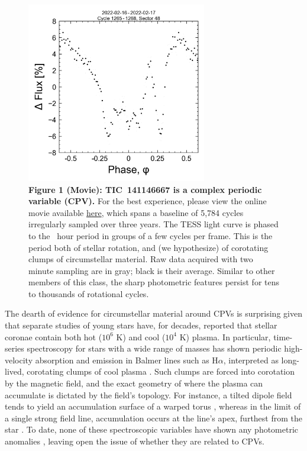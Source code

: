 \documentclass{nature3}
\begin{document}
\begin{figure}[!t]
  \centering
  \includegraphics[width=0.7\textwidth]{figures/f1.png}
  \caption[]{{\bf Figure 1 (Movie):  TIC~141146667 is a complex periodic
  variable (CPV).} For the best experience, please view the online movie
  available
  \href{https://lgbouma.com/movies/movie_TIC1411_flux_phase.mp4}{here},
  which spans a baseline of 5{,}784 cycles irregularly sampled over three
  years.  The TESS light curve is phased to the \periodhr\ hour period in
  groups of a few cycles per frame.  This is the period both of
  stellar rotation, and (we hypothesize) of corotating clumps of
  circumstellar material.  Raw data acquired with two minute
  sampling are in gray; black is their average.  Similar to other members
  of this class, the sharp photometric features persist for tens to
  thousands of rotational cycles. }
  \label{fig:lc}
\end{figure}


The dearth of evidence for circumstellar material around CPVs is
surprising given that separate studies of young stars have, for
decades, reported that stellar coronae contain both hot ($10^6$ K) and
cool ($10^4$ K) plasma. In particular, time-series spectroscopy for
stars with a wide range of masses has shown periodic high-velocity
absorption and emission in Balmer lines such as H$\alpha$, interpreted
as long-lived, corotating clumps of cool plasma
\cite{CollierCameron1989,Donati2000,Dunstone2006,Skelly2008}.
Such clumps are forced into corotation by the magnetic field, and the
exact geometry of where the plasma can accumulate is dictated by the
field's topology.  For instance, a tilted dipole field tends
to yield an accumulation surface of a warped torus
\cite{Townsend2005}, whereas in the limit of a single strong field
line, accumulation occurs at the line's apex, furthest from the star
\cite{Waugh2022}.
To date, none of these spectroscopic variables have shown any
photometric anomalies \cite{Bouma2024}, leaving open the issue of
whether they are related to CPVs.
\end{document}
